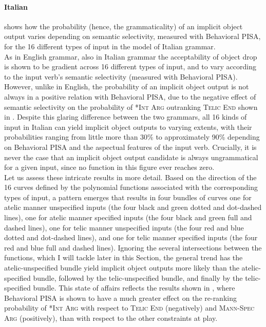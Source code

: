 \paragraph{Italian} 
 shows how the probability (hence, the grammaticality) of an implicit object output varies depending on semantic selectivity, measured with Behavioral PISA, for the 16 different types of input in the model of Italian grammar.\\
As in English grammar, also in Italian grammar the acceptability of object drop is shown to be gradient across 16 different types of input, and to vary according to the input verb's semantic selectivity (measured with Behavioral PISA). However, unlike in English, the probability of an implicit object output is not always in a positive relation with Behavioral PISA, due to the negative effect of semantic selectivity on the probability of \textsc{*Int Arg} outranking \textsc{Telic End} shown in . Despite this glaring difference between the two grammars, all 16 kinds of input in Italian can yield implicit object outputs to varying extents, with their probabilities ranging from little more than 30\% to approximately 90\% depending on Behavioral PISA and the aspectual features of the input verb. Crucially, it is never the case that an implicit object output candidate is always ungrammatical for a given input, since no function in this figure ever reaches zero.\\
Let us assess these intricate results in more detail. Based on the direction of the 16 curves defined by the polynomial functions associated with the corresponding types of input, a pattern emerges that results in four bundles of curves \textemdash one for atelic manner unspecified inputs (the four black and green dotted and dot-dashed lines), one for atelic manner specified inputs (the four black and green full and dashed lines), one for telic manner unspecified inputs (the four red and blue dotted and dot-dashed lines), and one for telic manner specified inputs (the four red and blue full and dashed lines). Ignoring the several intersections between the functions, which I will tackle later in this Section, the general trend has the atelic-unspecified bundle yield implicit object outputs more likely than the atelic-specified bundle, followed by the telic-unspecified bundle, and finally by the telic-specified bundle. This state of affairs reflects the results shown in , where Behavioral PISA is shown to have a much greater effect on the re-ranking probability of \textsc{*Int Arg} with respect to \textsc{Telic End} (negatively) and \textsc{Mann-Spec Arg} (positively), than with respect to the other constraints at play.

